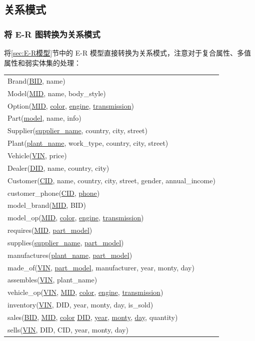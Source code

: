 \documentclass[hyperref,a4paper,UTF8]{ctexart}
\begin{document}
\subsection{关系模式}

\subsubsection{将 E-R 图转换为关系模式}

将\ref{sec:E-R模型}节中的 E-R 模型直接转换为关系模式，注意对于复合属性、多值属性和弱实体集的处理：

\begin{center}
    \begin{tabular}{l}
        Brand(\underline{BID}, name)\\
        Model(\underline{MID}, name, body\_style)\\
        Option(\underline{MID}, \underline{color}, \underline{engine}, \underline{transmission})\\
        Part(\underline{model}, name, info)\\
        Supplier(\underline{supplier\_name}, country, city, street)\\
        Plant(\underline{plant\_name}, work\_type, country, city, street)\\
        Vehicle(\underline{VIN}, price)\\
        Dealer(\underline{DID}, name, country, city)\\
        Customer(\underline{CID}, name, country, city, street, gender, annual\_income)\\
        customer\_phone(\underline{CID}, \underline{phone})\\
        model\_brand(\underline{MID}, BID)\\
        model\_op(\underline{MID}, \underline{color}, \underline{engine}, \underline{transmission})\\
        requires(\underline{MID}, \underline{part\_model})\\
        supplies(\underline{supplier\_name}, \underline{part\_model})\\
        manufactures(\underline{plant\_name}, \underline{part\_model})\\
        made\_of(\underline{VIN}, \underline{part\_model}, manufacturer, year, monty, day)\\
        assembles(\underline{VIN}, plant\_name)\\
        vehicle\_op(\underline{VIN}, \underline{MID}, \underline{color}, \underline{engine}, \underline{transmission})\\
        inventory(\underline{VIN}, DID, year, monty, day, is\_sold)\\
        sales(\underline{BID}, \underline{MID}, \underline{color} \underline{DID}, \underline{year}, \underline{monty}, \underline{day}, quantity)\\
        sells(\underline{VIN}, DID, CID, year, monty, day)
    \end{tabular}
\end{center}
\end{document}
